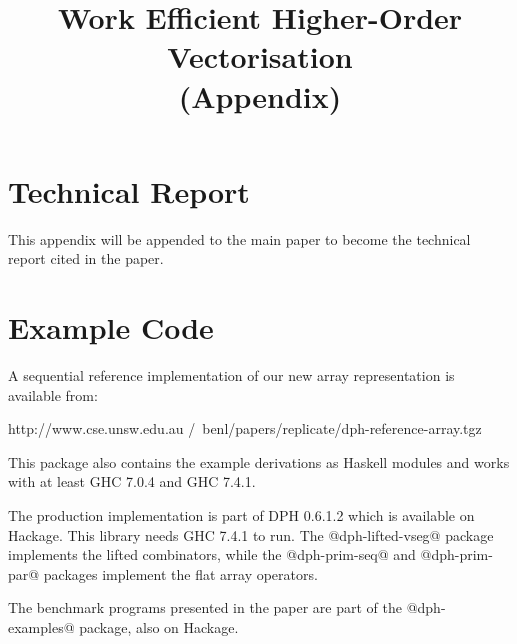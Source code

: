 \documentclass[preprint]{sigplanconf}
\begin{document}
\title	{Work Efficient Higher-Order Vectorisation\\(Appendix)}


\maketitle
\makeatactive

\section{Technical Report}
This appendix will be appended to the main paper to become the technical report cited in the paper. 

\section{Example Code}
A sequential reference implementation of our new array representation is available from:
\begin{small}
\begin{code}
http://www.cse.unsw.edu.au
         /~benl/papers/replicate/dph-reference-array.tgz
\end{code}
\end{small}
This package also contains the example derivations as Haskell modules and works with at least GHC 7.0.4 and GHC 7.4.1.

\medskip
\noindent
The production implementation is part of DPH 0.6.1.2 which is available on Hackage. This library needs GHC 7.4.1 to run. The @dph-lifted-vseg@ package implements the lifted combinators, while the @dph-prim-seq@ and @dph-prim-par@ packages implement the flat array operators.

\medskip
\noindent
The benchmark programs presented in the paper are part of the @dph-examples@ package, also on Hackage.


% 
\end{document}

